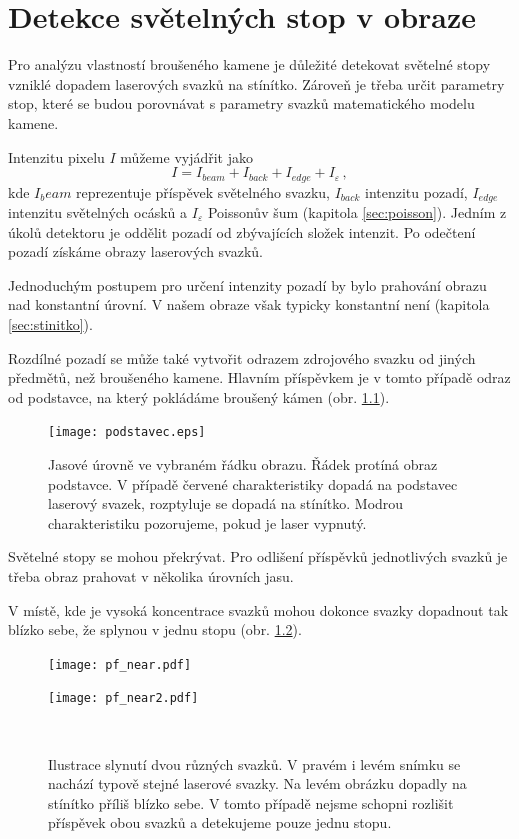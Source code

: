 \chapter{Detekce světelných stop v obraze}
\label{sec:detection}
Pro analýzu vlastností broušeného kamene je důležité detekovat světelné stopy vzniklé dopadem laserových svazků na stínítko. Zároveň je třeba určit parametry stop, které se budou porovnávat s parametry svazků matematického modelu kamene. 

Intenzitu pixelu $I$ můžeme vyjádřit jako 
\begin{equation}
	I = I_{beam}+I_{back}+I_{edge}+I_{\varepsilon}\,,
	\label{eq:intensitu_sum}
\end{equation}
 kde $I_beam$ reprezentuje příspěvek světelného svazku, $I_{back}$ intenzitu pozadí, $I_{edge}$ intenzitu světelných ocásků a $I_{\varepsilon}$ Poissonův šum (kapitola \ref{sec:poisson}). Jedním z úkolů detektoru je oddělit pozadí od zbývajících složek intenzit. Po odečtení pozadí získáme obrazy laserových svazků.   
 
Jednoduchým postupem pro určení intenzity pozadí by bylo prahování obrazu nad konstantní úrovní. V našem obraze však typicky konstantní není (kapitola \ref{sec:stinitko}). 

Rozdílné pozadí se může také vytvořit odrazem zdrojového svazku od jiných předmětů, než broušeného kamene. Hlavním příspěvkem je v tomto případě odraz od podstavce, na který pokládáme broušený kámen (obr. \ref{fig: podstavec}).

\begin{figure}[htps]
\centering
\texttt{[image: podstavec.eps]}
\caption{Jasové úrovně ve vybraném řádku obrazu. Řádek protíná obraz podstavce. V případě červené charakteristiky dopadá na podstavec laserový svazek, rozptyluje se dopadá na stínítko. Modrou charakteristiku pozorujeme, pokud je laser vypnutý.}
\label{fig: podstavec}
\end{figure}

Světelné stopy se mohou překrývat. Pro odlišení příspěvků jednotlivých svazků je třeba obraz prahovat v několika úrovních jasu.

V místě, kde je vysoká koncentrace svazků mohou dokonce svazky dopadnout tak blízko sebe, že splynou v jednu stopu (obr. \ref{Splynuti}).  

\begin{figure}[htbp]
    \centering
    \begin{minipage}[c]{0.48\textwidth}
        \centering\texttt{[image: pf\_near.pdf]}
    \end{minipage}
    \begin{minipage}[c]{0.48\textwidth}
        \centering\texttt{[image: pf\_near2.pdf]}
    \end{minipage}
    \\
        \caption[Slynutí dvou různých svazků.]{Ilustrace slynutí dvou různých svazků. V pravém i levém snímku se nachází typově stejné laserové svazky. Na levém obrázku dopadly na stínítko příliš blízko sebe. V tomto případě nejsme schopni rozlišit příspěvek obou svazků a detekujeme pouze jednu stopu.}
        \label{Splynuti}
\end{figure}

